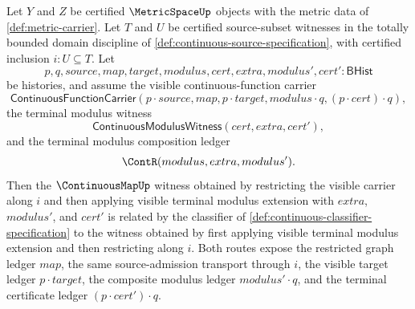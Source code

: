 \begin{theorem}
\label{thm:uniform-continuity-restriction-visible-terminal-modulus-commutes}
Let $Y$ and $Z$ be certified $\MetricSpaceUp$ objects with the metric data of \autoref{def:metric-carrier}. Let $T$ and $U$ be certified source-subset witnesses in the totally bounded domain discipline of \autoref{def:continuous-source-specification}, with certified inclusion $i:U\subseteq T$. Let
$$
p,q,source,map,target,modulus,cert,extra,modulus',cert':\mathsf{BHist}
$$
be histories, and assume the visible continuous-function carrier
$$
\mathsf{ContinuousFunctionCarrier}(p\cdot source,map,p\cdot target,
modulus\cdot q,(p\cdot cert)\cdot q),
$$
the terminal modulus witness
$$
\mathsf{ContinuousModulusWitness}(cert,extra,cert'),
$$
and the terminal modulus composition ledger
$$
\ContR(modulus,extra,modulus').
$$
Then the $\ContinuousMapUp$ witness obtained by restricting the visible carrier along $i$ and then applying visible terminal modulus extension with $extra$, $modulus'$, and $cert'$ is related by the classifier of \autoref{def:continuous-classifier-specification} to the witness obtained by first applying visible terminal modulus extension and then restricting along $i$. Both routes expose the restricted graph ledger $map$, the same source-admission transport through $i$, the visible target ledger $p\cdot target$, the composite modulus ledger $modulus'\cdot q$, and the terminal certificate ledger $(p\cdot cert')\cdot q$.
\end{theorem}
